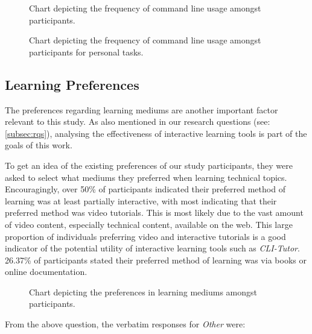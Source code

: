 \begin{figure}[htbp]
	\centering
	\scalebox{0.67}{}
	\caption{Chart depicting the frequency of command line usage amongst participants.}
	\label{fig:often}
\end{figure}

\begin{figure}[htbp]
	\centering
	\scalebox{0.67}{}
	\caption{Chart depicting the frequency of command line usage amongst participants for personal tasks.}
	\label{fig:often2}
\end{figure}


\FloatBarrier %

\subsection{Learning Preferences}

The preferences regarding learning mediums are another important factor relevant
to this study. As also mentioned in our research questions (see:
\autoref{subsec:rqs}), analysing the effectiveness of interactive learning
tools is part of the goals of this work.

To get an idea of the existing preferences of our study participants, they were
asked to select what mediums they preferred when learning technical topics.
Encouragingly, over 50\% of participants indicated their preferred method of
learning was at least partially interactive, with most indicating that their
preferred method was video tutorials. This is most likely due to the vast
amount of video content, especially technical content, available on the web.
This large proportion of individuals preferring video and interactive tutorials
is a good indicator of the potential utility of interactive learning tools
such as \textit{CLI-Tutor}. 26.37\% of participants stated their preferred
method of learning was via books or online documentation.

\begin{figure}[htbp]
	\centering
	\scalebox{0.67}{}
	\caption{Chart depicting the preferences in learning mediums amongst participants.}
	\label{fig:question}
\end{figure}


From the above question, the verbatim responses for \textit{Other} were:


